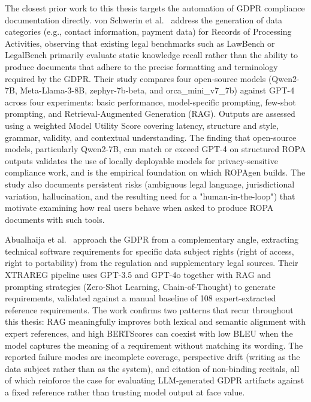 \sloppy
The closest prior work to this thesis targets the automation of GDPR compliance documentation directly. von Schwerin et al.\ \cite{schwerinSystematicComparisonOpen2024} address the generation of data categories (e.g., contact information, payment data) for Records of Processing Activities, observing that existing legal benchmarks such as LawBench or LegalBench primarily evaluate static knowledge recall rather than the ability to produce documents that adhere to the precise formatting and terminology required by the GDPR. Their study compares four open-source models (Qwen2-7B, Meta-Llama-3-8B, zephyr-7b-beta, and orca\_mini\_v7\_7b) against GPT-4 across four experiments: basic performance, model-specific prompting, few-shot prompting, and Retrieval-Augmented Generation (RAG). Outputs are assessed using a weighted Model Utility Score covering latency, structure and style, grammar, validity, and contextual understanding. The finding that open-source models, particularly Qwen2-7B, can match or exceed GPT-4 on structured ROPA outputs validates the use of locally deployable models for privacy-sensitive compliance work, and is the empirical foundation on which ROPAgen builds. The study also documents persistent risks (ambiguous legal language, jurisdictional variation, hallucination, and the resulting need for a "human-in-the-loop") that motivate examining how real users behave when asked to produce ROPA documents with such tools.
\fussy

Abualhaija et al.\ \cite{abualhaijaLLMassistedExtractionRegulatory2025} approach the GDPR from a complementary angle, extracting technical software requirements for specific data subject rights (right of access, right to portability) from the regulation and supplementary legal sources. Their XTRAREG pipeline uses GPT-3.5 and GPT-4o together with RAG and prompting strategies (Zero-Shot Learning, Chain-of-Thought) to generate requirements, validated against a manual baseline of 108 expert-extracted reference requirements. The work confirms two patterns that recur throughout this thesis: RAG meaningfully improves both lexical and semantic alignment with expert references, and high BERTScores can coexist with low BLEU when the model captures the meaning of a requirement without matching its wording. The reported failure modes are incomplete coverage, perspective drift (writing as the data subject rather than as the system), and citation of non-binding recitals, all of which reinforce the case for evaluating LLM-generated GDPR artifacts against a fixed reference rather than trusting model output at face value.

